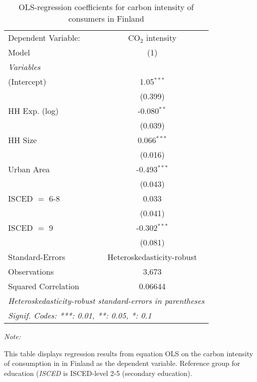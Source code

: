 
\begin{table}[htbp!]
   \centering
   \small
   \begin{adjustbox}{width = 1\textwidth, max height = 0.95\textheight, center}
      \begin{threeparttable}[b]
         \caption{\label{tab:OLS_1_FIN} OLS-regression coefficients for carbon intensity of consumers in Finland}
         \begin{tabular}{lc}
            \tabularnewline \midrule \midrule
            Dependent Variable: & CO$_{2}$ intensity\\  
            Model               & (1)\\  
            \midrule
            \emph{Variables}\\
            (Intercept)         & 1.05$^{***}$\\   
                                & (0.399)\\   
            HH Exp. (log)       & -0.080$^{**}$\\   
                                & (0.039)\\   
            HH Size             & 0.066$^{***}$\\   
                                & (0.016)\\   
            Urban Area          & -0.493$^{***}$\\   
                                & (0.043)\\   
            ISCED $=$ 6-8       & 0.033\\   
                                & (0.041)\\   
            ISCED $=$ 9         & -0.302$^{***}$\\   
                                & (0.081)\\   
            \midrule 
            Standard-Errors     & Heteroskedasticity-robust \\   
            Observations        & 3,673\\  
            Squared Correlation & 0.06644\\  
            \midrule \midrule
            \multicolumn{2}{l}{\emph{Heteroskedasticity-robust standard-errors in parentheses}}\\
            \multicolumn{2}{l}{\emph{Signif. Codes: ***: 0.01, **: 0.05, *: 0.1}}\\
         \end{tabular}
         
         \begin{tablenotes}\item \medskip \textit{Note:}
            \item This table displays regression results from equation OLS on the carbon intensity of consumption in  in Finland as the dependent variable. Reference group for education (\textit{ISCED} is ISCED-level 2-5 (secondary education).
         \end{tablenotes}
      \end{threeparttable}
   \end{adjustbox}
\end{table}


